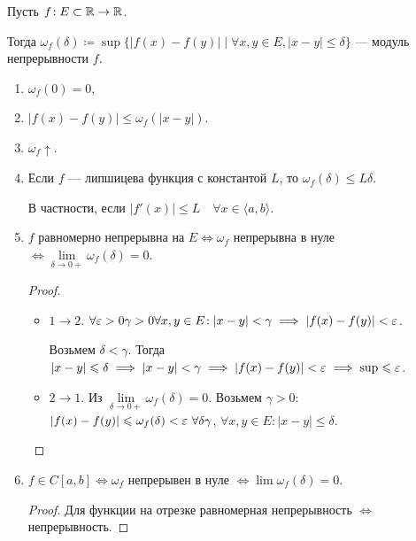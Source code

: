\begin{definition}
    Пусть $f\!: E \subset \mathbb{R} \to \mathbb{R}$.

    Тогда $\omega_f(\delta) \coloneqq \sup \{|f(x) - f(y)|\mid \forall x, y \in E, |x-y| \le \delta\}$ --- модуль непрерывности $f$.
\end{definition}
\begin{properties}
    \begin{enumerate}
        \item $\omega_f(0) = 0$,
        \item $|f(x) - f(y)| \le \omega_f(|x-y|)$.
        \item $\omega_f \uparrow$.
        \item Если  $f$ --- липшицева функция с константой $L$, то  $\omega_f(\delta) \le L \delta$.

            В частности, если $|f'(x)| \le L\quad \forall x \in \langle a, b \rangle$.
        \item $f$ равномерно непрерывна на $E \iff \omega_f$ непрерывна в нуле  $\iff \lim\limits_{\delta \to 0+} \omega_f(\delta) = 0$.
            \begin{proof}
                 \begin{itemize}
                     \item $1 \to 2$.  $\forall \varepsilon > 0 \gamma > 0 \forall x, y \in E\!: |x-y| < \gamma \implies |f(x) - f(y)| < \varepsilon$. 

                         Возьмем  $\delta < \gamma$. Тогда $|x-y| \leqslant \delta \implies |x-y| < \gamma \implies |f(x) - f(y)| < \varepsilon \implies \sup \leqslant \varepsilon$.
                     \item $2 \to 1$. Из $\lim\limits_{\delta \to 0+} \omega_f(\delta) = 0$. Возьмем  $\gamma > 0$:  $|f(x) - f(y)| \le \omega_f(\delta) < \eps\ \forall \delta \gamma$, $\forall x, y \in E\!: |x-y| \le \delta$.
                \end{itemize}
            \end{proof}
        \item $f \in C[a, b] \iff \omega_f$ непрерывен в нуле $\iff \lim \omega_f(\delta)= 0$. 
             \begin{proof}
                 Для функции на отрезке равномерная непрерывность $\iff $ непрерывность.
             \end{proof}
    \end{enumerate}
\end{properties}
